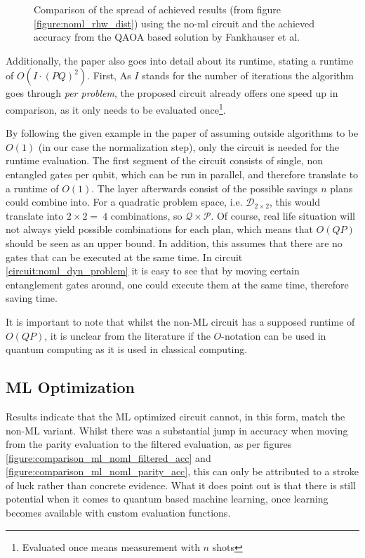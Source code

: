 \begin{figure}[!h]
    \centering
    
    \caption{Comparison of the spread of achieved results (from figure \ref{figure:noml_rhw_dist}) using the no-ml circuit and the achieved accuracy from the QAOA based solution by Fankhauser et al.\cite{fankhauser_multiple_2021} }
    \label{figure:final_comp_noml_qaoa}
\end{figure}


Additionally, the paper also goes into detail about its runtime, stating a runtime of $O(I · (PQ)^2)$. First, As $I$ stands for the number of iterations the algorithm goes through \emph{per problem}, the proposed circuit already offers one speed up in comparison, as it only needs to be evaluated once\footnote{Evaluated once means measurement with $n$ shots}. \par
By following the given example in the paper of assuming outside algorithms to be $O(1)$ (in our case the normalization step), only the circuit is needed for the runtime evaluation. The first segment of the circuit consists of single, non entangled gates per qubit, which can be run in parallel, and therefore translate to a runtime of $O(1)$.
The layer afterwards consist of the possible savings $n$ plans could combine into. For a quadratic problem space, i.e. $\mathcal{D}_{2\times2}$, this would translate into $2\times2 =\ 4$ combinations, so $\mathcal{Q}\times\mathcal{P}$. Of course, real life situation will not always yield possible combinations for each plan, which means that $O(QP)$ should be seen as an upper bound. In addition, this assumes that there are no gates that can be executed at the same time. In circuit \ref{circuit:noml_dyn_problem} it is easy to see that by moving certain entanglement gates around, one could execute them at the same time, therefore saving time. \par
It is important to note that whilst the non-ML circuit has a supposed runtime of $O(QP)$, it is unclear from the literature if the $O$-notation can be used in quantum computing as it is used in classical computing.

\subsection{ML Optimization}
Results indicate that the ML optimized circuit cannot, in this form, match the non-ML variant. Whilst there was a substantial jump in accuracy when moving from the parity evaluation to the filtered evaluation, as per figures \ref{figure:comparison_ml_noml_filtered_acc} and \ref{figure:comparison_ml_noml_parity_acc}, this can only be attributed to a stroke of luck rather than concrete evidence. What it does point out is that there is still potential when it comes to quantum based machine learning, once learning becomes available with custom evaluation functions. \par


